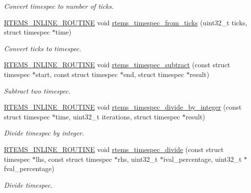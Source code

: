 \begin{DoxyCompactItemize}
\begin{DoxyCompactList}\small\item\em Convert timespec to number of ticks. \end{DoxyCompactList}\item 
\mbox{\hyperlink{group__RTEMSScoreBaseDefs_gac216239df231d5dbd15e3520b0b9313f}{R\+T\+E\+M\+S\+\_\+\+I\+N\+L\+I\+N\+E\+\_\+\+R\+O\+U\+T\+I\+NE}} void \mbox{\hyperlink{group__TimespecAPI_ga11b9b11579a7677f48cc931100c5e27d}{rtems\+\_\+timespec\+\_\+from\+\_\+ticks}} (uint32\+\_\+t ticks, struct timespec $\ast$time)
\begin{DoxyCompactList}\small\item\em Convert ticks to timespec. \end{DoxyCompactList}\item 
\mbox{\hyperlink{group__RTEMSScoreBaseDefs_gac216239df231d5dbd15e3520b0b9313f}{R\+T\+E\+M\+S\+\_\+\+I\+N\+L\+I\+N\+E\+\_\+\+R\+O\+U\+T\+I\+NE}} void \mbox{\hyperlink{group__TimespecAPI_ga6dd5158f6fd9fe9995429ce6e21f04e2}{rtems\+\_\+timespec\+\_\+subtract}} (const struct timespec $\ast$start, const struct timespec $\ast$end, struct timespec $\ast$result)
\begin{DoxyCompactList}\small\item\em Subtract two timespec. \end{DoxyCompactList}\item 
\mbox{\hyperlink{group__RTEMSScoreBaseDefs_gac216239df231d5dbd15e3520b0b9313f}{R\+T\+E\+M\+S\+\_\+\+I\+N\+L\+I\+N\+E\+\_\+\+R\+O\+U\+T\+I\+NE}} void \mbox{\hyperlink{group__TimespecAPI_ga0f1a2c871c3685cb994c6862dc9a1281}{rtems\+\_\+timespec\+\_\+divide\+\_\+by\+\_\+integer}} (const struct timespec $\ast$time, uint32\+\_\+t iterations, struct timespec $\ast$result)
\begin{DoxyCompactList}\small\item\em Divide timespec by integer. \end{DoxyCompactList}\item 
\mbox{\hyperlink{group__RTEMSScoreBaseDefs_gac216239df231d5dbd15e3520b0b9313f}{R\+T\+E\+M\+S\+\_\+\+I\+N\+L\+I\+N\+E\+\_\+\+R\+O\+U\+T\+I\+NE}} void \mbox{\hyperlink{group__TimespecAPI_ga2a855486ab6aca240327847fa409aa19}{rtems\+\_\+timespec\+\_\+divide}} (const struct timespec $\ast$lhs, const struct timespec $\ast$rhs, uint32\+\_\+t $\ast$ival\+\_\+percentage, uint32\+\_\+t $\ast$fval\+\_\+percentage)
\begin{DoxyCompactList}\small\item\em Divide timespec. \end{DoxyCompactList}\item 

\end{DoxyCompactItemize}
